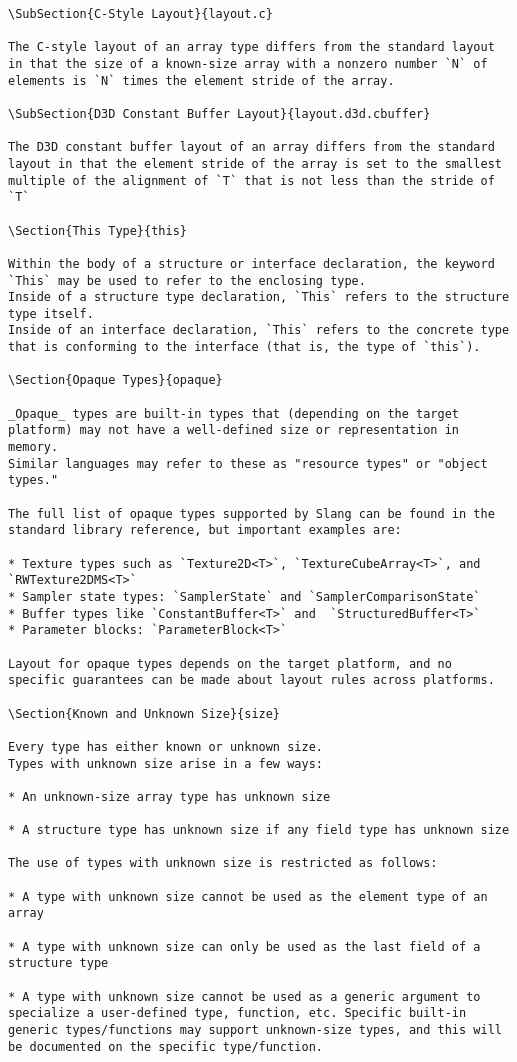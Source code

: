 \begin{verbatim}
\SubSection{C-Style Layout}{layout.c}

The C-style layout of an array type differs from the standard layout in that the size of a known-size array with a nonzero number `N` of elements is `N` times the element stride of the array.

\SubSection{D3D Constant Buffer Layout}{layout.d3d.cbuffer}

The D3D constant buffer layout of an array differs from the standard layout in that the element stride of the array is set to the smallest multiple of the alignment of `T` that is not less than the stride of `T`

\Section{This Type}{this}

Within the body of a structure or interface declaration, the keyword `This` may be used to refer to the enclosing type.
Inside of a structure type declaration, `This` refers to the structure type itself.
Inside of an interface declaration, `This` refers to the concrete type that is conforming to the interface (that is, the type of `this`).

\Section{Opaque Types}{opaque}

_Opaque_ types are built-in types that (depending on the target platform) may not have a well-defined size or representation in memory.
Similar languages may refer to these as "resource types" or "object types."

The full list of opaque types supported by Slang can be found in the standard library reference, but important examples are:

* Texture types such as `Texture2D<T>`, `TextureCubeArray<T>`, and `RWTexture2DMS<T>`
* Sampler state types: `SamplerState` and `SamplerComparisonState`
* Buffer types like `ConstantBuffer<T>` and  `StructuredBuffer<T>`
* Parameter blocks: `ParameterBlock<T>`

Layout for opaque types depends on the target platform, and no specific guarantees can be made about layout rules across platforms.

\Section{Known and Unknown Size}{size}

Every type has either known or unknown size.
Types with unknown size arise in a few ways:

* An unknown-size array type has unknown size

* A structure type has unknown size if any field type has unknown size

The use of types with unknown size is restricted as follows:

* A type with unknown size cannot be used as the element type of an array

* A type with unknown size can only be used as the last field of a structure type

* A type with unknown size cannot be used as a generic argument to specialize a user-defined type, function, etc. Specific built-in generic types/functions may support unknown-size types, and this will be documented on the specific type/function.
\end{verbatim}